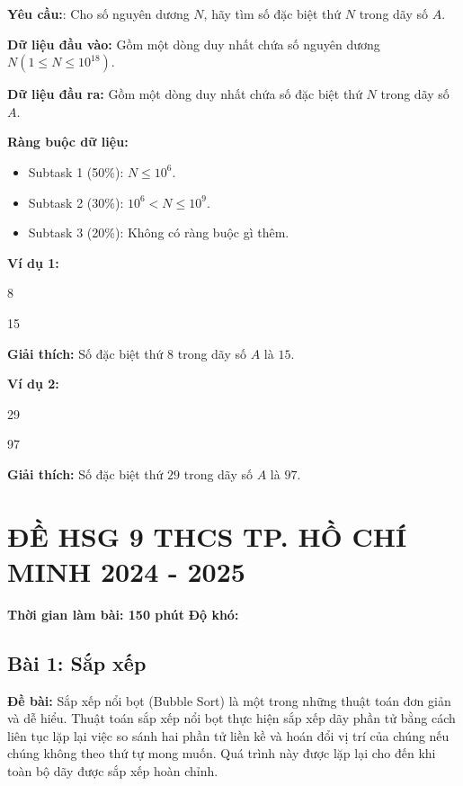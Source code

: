 \documentclass[12pt]{scrartcl}  %
\begin{document}
\textbf{Yêu cầu:}:
Cho số nguyên dương $N$, hãy tìm số đặc biệt thứ $N$ trong dãy số $A$.

\textbf{Dữ liệu đầu vào:}
Gồm một dòng duy nhất chứa số nguyên dương $N (1 \leq N \leq 10^{18})$. 

\textbf{Dữ liệu đầu ra:}
Gồm một dòng duy nhất chứa số đặc biệt thứ $N$ trong dãy số $A$.

\textbf{Ràng buộc dữ liệu:}
\begin{itemize}
    \item Subtask 1 (50\%): $N \leq 10^6$.
    \item Subtask 2 (30\%): $10^6 < N \leq 10^9$.
    \item Subtask 3 (20\%): Không có ràng buộc gì thêm.
\end{itemize}

\textbf{Ví dụ 1:}
\begin{tcolorbox}[colback=gray!5!white, colframe=blue!50!black, title=Input]
8
\end{tcolorbox}

\begin{tcolorbox}[colback=gray!5!white, colframe=green!50!black, title=Output]
15
\end{tcolorbox}

\textbf{Giải thích:}
Số đặc biệt thứ $8$ trong dãy số $A$ là $15$.

\textbf{Ví dụ 2:}

\begin{tcolorbox}[colback=gray!5!white, colframe=blue!50!black, title=Input]
29
\end{tcolorbox}

\begin{tcolorbox}[colback=gray!5!white, colframe=green!50!black, title=Output]
97
\end{tcolorbox}

\textbf{Giải thích:}
Số đặc biệt thứ $29$ trong dãy số $A$ là $97$.

\section{ĐỀ HSG 9 THCS TP. HỒ CHÍ MINH 2024 - 2025}
\textbf{Thời gian làm bài: 150 phút}
\textbf{Độ khó: }

\subsection{Bài 1: Sắp xếp}
\textbf{Đề bài:}
Sắp xếp nổi bọt (Bubble Sort) là một trong những thuật toán đơn giản và dễ hiểu. Thuật toán sắp xếp nổi bọt 
thực hiện sắp xếp dãy phần tử bằng cách liên tục lặp lại việc so sánh hai phần tử liền kề và hoán đổi vị trí của chúng
nếu chúng không theo thứ tự mong muốn. Quá trình này được lặp lại cho đến khi toàn bộ dãy được sắp xếp hoàn chỉnh.
\end{document}
